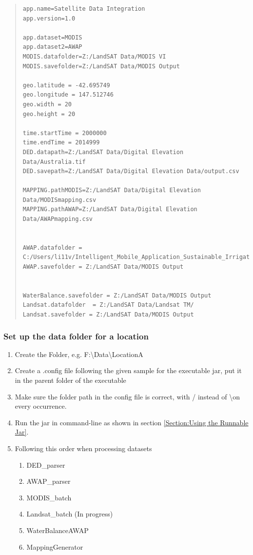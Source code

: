 \begin{quote}
\begin{lstlisting}  
app.name=Satellite Data Integration
app.version=1.0

app.dataset=MODIS
app.dataset2=AWAP
MODIS.datafolder=Z:/LandSAT Data/MODIS VI
MODIS.savefolder=Z:/LandSAT Data/MODIS Output

geo.latitude = -42.695749
geo.longitude = 147.512746
geo.width = 20
geo.height = 20

time.startTime = 2000000
time.endTime = 2014999
DED.datapath=Z:/LandSAT Data/Digital Elevation Data/Australia.tif
DED.savepath=Z:/LandSAT Data/Digital Elevation Data/output.csv

MAPPING.pathMODIS=Z:/LandSAT Data/Digital Elevation Data/MODISmapping.csv
MAPPING.pathAWAP=Z:/LandSAT Data/Digital Elevation Data/AWAPmapping.csv


AWAP.datafolder = C:/Users/li11v/Intelligent_Mobile_Application_Sustainable_Irrigation_Water_Usage_DSS/res/CosmOz
AWAP.savefolder = Z:/LandSAT Data/MODIS Output


WaterBalance.savefolder = Z:/LandSAT Data/MODIS Output
Landsat.datafolder  = Z:/LandSAT Data/Landsat TM/
Landsat.savefolder = Z:/LandSAT Data/MODIS Output
\end{lstlisting}
\end{quote}

\subsubsection{Set up the data folder for a location}
\begin{enumerate}
\item
Create the Folder, e.g. F:\textbackslash Data\textbackslash LocationA\\
\item
Create a .config file following the given sample for the executable jar, put it in the parent folder of the executable
\item
Make sure the folder path in the config file is correct, with / instead of \textbackslash on every occurrence.
\item
Run the jar in command-line as shown in section \ref{Section:Using the Runnable Jar}.
\item
Following this order when processing datasets
	\begin{enumerate}
	\item
	DED\_parser
	\item
	AWAP\_parser
	\item
	MODIS\_batch
	\item
	Landsat\_batch (In progress)
	\item
	WaterBalanceAWAP
	\item
	MappingGenerator	
	\end{enumerate}
\end{enumerate}
